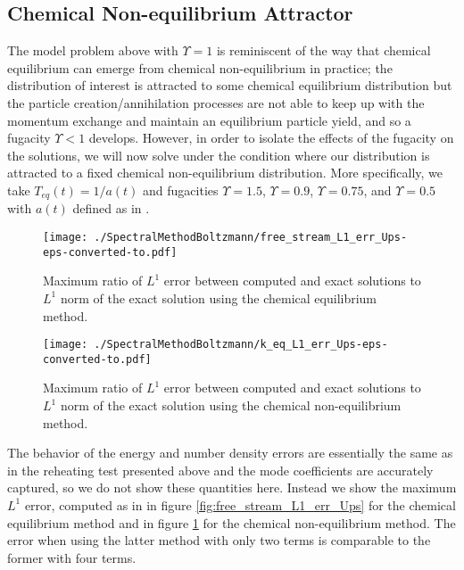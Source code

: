\subsection{Chemical Non-equilibrium Attractor}
The model problem above with $\Upsilon=1$  is reminiscent of the way that chemical equilibrium can emerge from chemical non-equilibrium in practice; the distribution of interest is attracted to some chemical equilibrium distribution but the particle creation/annihilation processes are not able to keep up with the momentum exchange and maintain an equilibrium particle yield, and so a fugacity $\Upsilon<1$ develops.  However, in order to isolate the effects of the fugacity on the solutions, we will now solve  under the  condition where our distribution is attracted to a fixed chemical non-equilibrium distribution.  More specifically, we take $T_{eq}(t)=1/a(t)$ and fugacities $\Upsilon=1.5$, $\Upsilon=0.9$, $\Upsilon=0.75$, and $\Upsilon=0.5$ with $a(t)$ defined as in .


\begin{figure}[H]
 \begin{minipage}[t]{0.5\linewidth}
\centerline{\texttt{[image: ./SpectralMethodBoltzmann/free\_stream\_L1\_err\_Ups-eps-converted-to.pdf]}}
\caption{Maximum ratio  of $L^1$ error between computed and exact solutions to $L^1$ norm of the exact solution using the chemical equilibrium method.}\label{fig:free_stream_L1_err_Ups}
 \end{minipage}
 \hspace{0.5cm}
 \begin{minipage}[t]{0.5\linewidth}
\centerline{\texttt{[image: ./SpectralMethodBoltzmann/k\_eq\_L1\_err\_Ups-eps-converted-to.pdf]}}
\caption{Maximum ratio of $L^1$ error between computed and exact solutions to $L^1$ norm of the exact solution using the chemical non-equilibrium method.}\label{fig:k_eq_L1_err_Ups}
 \end{minipage}
 \end{figure}


The behavior of the energy and number density errors are essentially the same as in the reheating test presented above and the mode coefficients are accurately captured, so we do not show these quantities here.  Instead  we show the maximum $L^1$ error, computed as in  in figure \ref{fig:free_stream_L1_err_Ups} for the chemical equilibrium method and in figure \ref{fig:k_eq_L1_err_Ups} for the chemical non-equilibrium method.  The error when using the latter method with only two terms is comparable to the former with four terms.  




